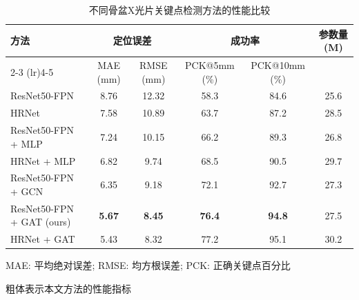 
\begin{table}[htbp]
    \centering
    \caption{不同骨盆X光片关键点检测方法的性能比较}
    \label{tab:model_comparison}
    \begin{threeparttable}
        \begin{tabular}{lccccc}
            \toprule
            \multirow{2}{*}{方法} & \multicolumn{2}{c}{定位误差} & \multicolumn{2}{c}{成功率} & \multirow{2}{*}{参数量 (M)} \\
            \cmidrule(lr){2-3} \cmidrule(lr){4-5}
            & MAE (mm) & RMSE (mm) & PCK@5mm (\%) & PCK@10mm (\%) & \\
            \midrule
            ResNet50-FPN & 8.76 & 12.32 & 58.3 & 84.6 & 25.6 \\
            HRNet & 7.58 & 10.89 & 63.7 & 87.2 & 28.5 \\
            ResNet50-FPN + MLP & 7.24 & 10.15 & 66.2 & 89.3 & 26.8 \\
            HRNet + MLP & 6.82 & 9.74 & 68.5 & 90.5 & 29.7 \\
            ResNet50-FPN + GCN & 6.35 & 9.18 & 72.1 & 92.7 & 27.3 \\
            ResNet50-FPN + GAT (ours) & \textbf{5.67} & \textbf{8.45} & \textbf{76.4} & \textbf{94.8} & 27.5 \\
            HRNet + GAT & 5.43 & 8.32 & 77.2 & 95.1 & 30.2 \\
            \bottomrule
        \end{tabular}
        \begin{tablenotes}
            \footnotesize
            \item[*] MAE: 平均绝对误差; RMSE: 均方根误差; PCK: 正确关键点百分比
            \item 粗体表示本文方法的性能指标
        \end{tablenotes}
    \end{threeparttable}
\end{table}

